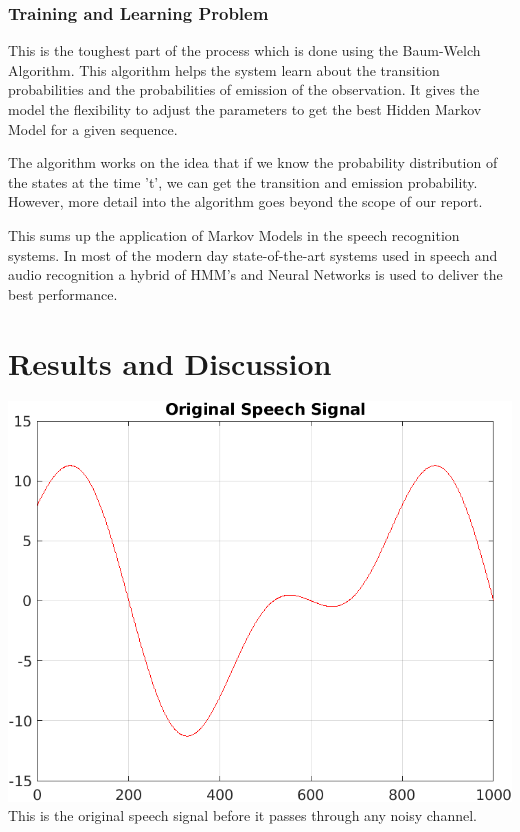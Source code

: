 \documentclass[10pt,twocolumn,letterpaper]{article}
\begin{document}
\subsubsection{Training and Learning Problem}
This is the toughest part of the process which is done using the Baum-Welch Algorithm. This algorithm helps the system learn about the transition probabilities and the probabilities of emission of the observation. It gives the model the flexibility to adjust the parameters to get the best Hidden Markov Model for a given sequence.

The algorithm works on the idea that if we know the probability distribution of the states at the time 't', we can get the transition and emission probability. However, more detail into the algorithm goes beyond the scope of our report.

This sums up the application of Markov Models in the speech recognition systems. In most of the modern day state-of-the-art systems used in speech and audio recognition a hybrid of HMM's and Neural Networks is used to deliver the best performance.

\section{Results and Discussion}

\begin{center}
    \includegraphics[scale=0.55]{Original.png}\\
    This is the original speech signal before it passes through any noisy channel. 
\end{center}
\end{document}
